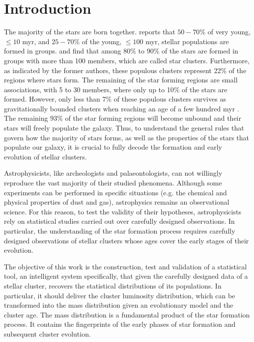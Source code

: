 \chapter{Introduction}
\label{chap:introduction}

The majority of the stars are born together. \citet{2000AJ....120.3139C} reports that $50-70\%$ of very young, $\leq10$ \gls{myr}, and $25-70\%$ of the young, $\leq100$ \gls{myr}, stellar populations are formed in groups. \citet{2003AJ....126.1916P} and \citet{2003ARA&A..41...57L} find that among 80\% to 90\% of the stars are formed in groups with more than 100 members, which are called star clusters. Furthermore, as indicated by the former authors, these populous clusters represent 22\% of the regions where stars form. The remaining of the star forming regions are small associations, with 5 to 30 members, where only up to 10\% of the stars are formed. However, only less than 7\% of these populous clusters survives as gravitationally bounded clusters when reaching an age of a few hundred \gls{myr} \citep{2003ARA&A..41...57L}. The remaining 93\% of the star forming regions will become unbound and their stars will freely populate the galaxy. Thus, to understand the general rules that govern how the majority of stars forms, as well as the properties of the stars that populate our galaxy, it is crucial to fully decode the formation and early evolution of stellar clusters. 

Astrophysicists, like archeologists and palaeontologists, can not willingly reproduce the vast majority of their studied phenomena. Although some experiments can be performed in specific situations (e.g. the chemical and physical  properties of dust and gas), astrophysics remains an observational science. For this reason, to test the validity of their hypotheses, astrophysicists rely on statistical studies carried out over carefully designed observations. In particular, the understanding of the star formation process requires carefully designed observations of  stellar clusters whose ages cover the early stages of their evolution.

The objective of this work is the construction, test and validation of a statistical tool, an intelligent system specifically, that given the carefully designed data of a stellar cluster, recovers the statistical distributions of its populations. In particular, it should deliver the cluster luminosity distribution, which can be transformed into the mass distribution given an evolutionary model and the cluster age. The mass distribution is a fundamental product of the star formation process. It contains the fingerprints of the early phases of star formation and subsequent cluster evolution.

